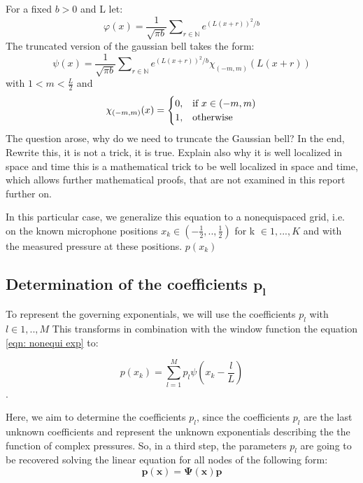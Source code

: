 \documentclass[11pt]{report} %
\begin{document}
For a fixed $b>0$ and L let:
\begin{equation}
\varphi(x)= \frac{1}{\sqrt{\pi b}} \sum\nolimits_{r \in \mathbb{N}}  e^{(L(x+r))^2/b}
\end{equation}
The truncated version of the gaussian bell takes the form: 
\begin{equation}
\psi(x)= \frac{1}{\sqrt{\pi b}} \sum\nolimits_{r \in \mathbb{N}}  e^{(L(x+r))^2/b}\chi_{(-m,m)}(L(x+r))
\end{equation}
with $1<m < \frac{L}{2}$ and
\begin{equation}
    \chi_{(-m,m)}(x)=
    \begin{cases}
      0, & \text{if}\ x\in (-m,m) \\
      1, & \text{otherwise}
    \end{cases}\notag
\end{equation} 
The question arose, why do we need to truncate the Gaussian bell? In the end, {\color{red} Rewrite this, it is not a trick, it is true. Explain also why it is well localized in space and time} this is a mathematical trick to be well localized in space and time, which allows further mathematical proofs, that are not examined in this report further on.

In this particular case, we generalize this equation to a nonequispaced grid, i.e. on the known microphone positions $x_{k}\in (-\frac{1}{2},..,\frac{1}{2})$ for k $\in{1,..., K}$ and with the measured pressure at these positions.  $p(x_{k}) $


\subsection{Determination of the coefficients $\bm{p_l}$}
To represent the governing exponentials, we will use the coefficients $p_l$ with $l \in{1,..,M}$    
This transforms in combination with the window function the equation \eqref{eqn: nonequi exp} to: 

\begin{equation}
p(x_{k})=\sum\limits_{l=1}^M p_{l}\psi(x_{k}-\frac{l}{L})\label{eqn: linear system}
\end{equation}.

Here, we aim to determine the coefficients $p_l$, since the coefficients $p_l$ are the last unknown coefficients and represent the unknown exponentials describing the the function of complex pressures.
So, in a third step, the parameters $p_l$ are going to be recovered solving the linear equation for all nodes of the following form: 
\begin{equation}
\bm{p(x)} = \bm{\Psi (x)} \bm{p}
\end{equation}
\end{document}
